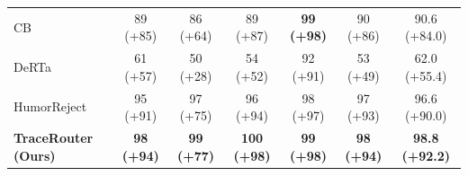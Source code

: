 \begin{table}[t]
{\begin{tabular}{l|cccccc}
\rowcolor{c4}CB~\cite{zou2024improving}
& 89 {\tiny (+85)}
& 86 {\tiny (+64)}
& 89 {\tiny (+87)}
& \textbf{99} {\tiny \textbf{(+98)}}
& 90 {\tiny (+86)}
& 90.6 {\tiny (+84.0)} \\
\rowcolor{c4}DeRTa~\cite{yuan2025refuse}
& 61 {\tiny (+57)}
& 50 {\tiny (+28)}
& 54 {\tiny (+52)}
& 92 {\tiny (+91)}
& 53 {\tiny (+49)}
& 62.0 {\tiny (+55.4)} \\
\rowcolor{c4}HumorReject~\cite{wu2025humorreject}
& 95 {\tiny (+91)}
& 97 {\tiny (+75)}
& 96 {\tiny (+94)}
& 98 {\tiny (+97)}
& 97 {\tiny (+93)}
& 96.6 {\tiny (+90.0)} \\
\hline
\rowcolor{c2}\textbf{TraceRouter (Ours)}
& \textbf{98} {\tiny \textbf{(+94)}}
& \textbf{99} {\tiny \textbf{(+77)}}
& \textbf{100} {\tiny \textbf{(+98)}}
& \textbf{99} {\tiny \textbf{(+98)}}
& \textbf{98} {\tiny \textbf{(+94)}}
& \textbf{98.8} {\tiny \textbf{(+92.2)}} \\
\hline
\bottomrule
\end{tabular}}
\vspace{-0.4cm}
\end{table}

